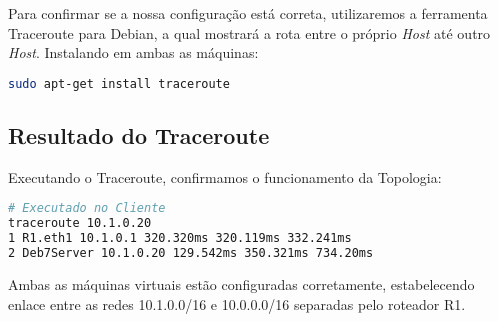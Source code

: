 Para confirmar se a nossa configuração está correta, utilizaremos a ferramenta Traceroute para Debian, a qual mostrará a rota entre o próprio \textit{Host} até outro \textit{Host}. Instalando em ambas as máquinas\cite{traceroute}:

\begin{lstlisting}[language=bash]
sudo apt-get install traceroute
\end{lstlisting}

\subsection{Resultado do Traceroute}

Executando o Traceroute, confirmamos o funcionamento da Topologia:

\begin{lstlisting}[language=bash]
# Executado no Cliente
traceroute 10.1.0.20
1 R1.eth1 10.1.0.1 320.320ms 320.119ms 332.241ms
2 Deb7Server 10.1.0.20 129.542ms 350.321ms 734.20ms
\end{lstlisting}

Ambas as máquinas virtuais estão configuradas corretamente, estabelecendo enlace entre as redes 10.1.0.0/16 e 10.0.0.0/16 separadas pelo roteador R1.